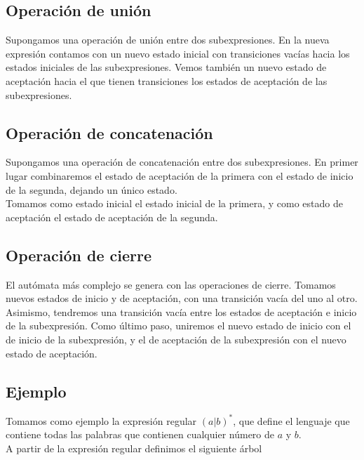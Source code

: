 \subsection{Operación de unión}
Supongamos una operación de unión entre dos subexpresiones.
En la nueva expresión contamos con un nuevo estado inicial con transiciones vacías hacia los estados iniciales de las subexpresiones.
Vemos también un nuevo estado de aceptación hacia el que tienen transiciones los estados de aceptación de las subexpresiones.


\subsection{Operación de concatenación}
Supongamos una operación de concatenación entre dos subexpresiones.
En primer lugar combinaremos el estado de aceptación de la primera con el estado de inicio de la segunda, dejando un único estado.
\\
Tomamos como estado inicial el estado inicial de la primera, y como estado de aceptación el estado de aceptación de la segunda.


\subsection{Operación de cierre}
El autómata más complejo se genera con las operaciones de cierre.
Tomamos nuevos estados de inicio y de aceptación, con una transición vacía del uno al otro.
Asimismo, tendremos una transición vacía entre los estados de aceptación e inicio de la subexpresión.
Como último paso, uniremos el nuevo estado de inicio con el de inicio de la subexpresión, y el de aceptación de la subexpresión con el nuevo estado de aceptación.


\subsection{Ejemplo}
Tomamos como ejemplo la expresión regular $(a|b)^*$, que define el lenguaje que contiene todas las palabras que contienen cualquier número de $a$ y $b$.
\\
A partir de la expresión regular definimos el siguiente árbol

